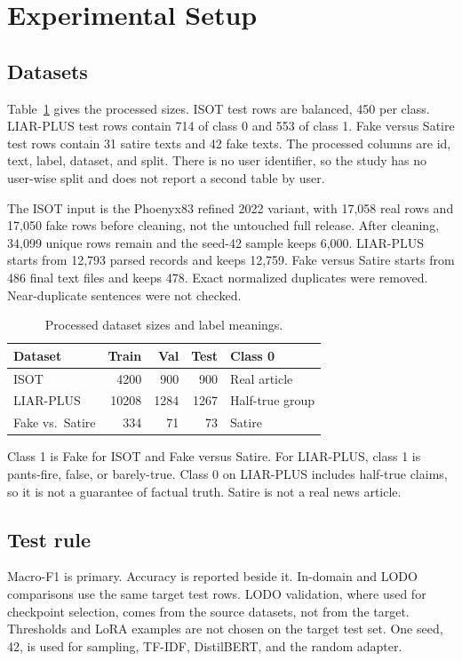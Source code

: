 \documentclass[conference,letterpaper]{IEEEtran}
\begin{document}
\section{Experimental Setup}
\subsection{Datasets}
Table~\ref{tab:data} gives the processed sizes. ISOT test rows are balanced, 450 per class. LIAR-PLUS test rows contain 714 of class 0 and 553 of class 1. Fake versus Satire test rows contain 31 satire texts and 42 fake texts. The processed columns are id, text, label, dataset, and split. There is no user identifier, so the study has no user-wise split and does not report a second table by user.

The ISOT input is the Phoenyx83 refined 2022 variant, with 17,058 real rows and 17,050 fake rows before cleaning, not the untouched full release. After cleaning, 34,099 unique rows remain and the seed-42 sample keeps 6,000. LIAR-PLUS starts from 12,793 parsed records and keeps 12,759. Fake versus Satire starts from 486 final text files and keeps 478. Exact normalized duplicates were removed. Near-duplicate sentences were not checked.

\begin{table}[t]
\caption{Processed dataset sizes and label meanings.}
\label{tab:data}
\centering
\scriptsize
\begin{tabular}{lrrrl}
\hline
Dataset & Train & Val & Test & Class 0 \\
\hline
ISOT & 4200 & 900 & 900 & Real article \\
LIAR-PLUS & 10208 & 1284 & 1267 & Half-true group \\
Fake vs.\ Satire & 334 & 71 & 73 & Satire \\
\hline
\end{tabular}
\end{table}

Class 1 is Fake for ISOT and Fake versus Satire. For LIAR-PLUS, class 1 is pants-fire, false, or barely-true. Class 0 on LIAR-PLUS includes half-true claims, so it is not a guarantee of factual truth. Satire is not a real news article.

\subsection{Test rule}
Macro-F1 is primary. Accuracy is reported beside it. In-domain and LODO comparisons use the same target test rows. LODO validation, where used for checkpoint selection, comes from the source datasets, not from the target. Thresholds and LoRA examples are not chosen on the target test set. One seed, 42, is used for sampling, TF-IDF, DistilBERT, and the random adapter.
\end{document}
